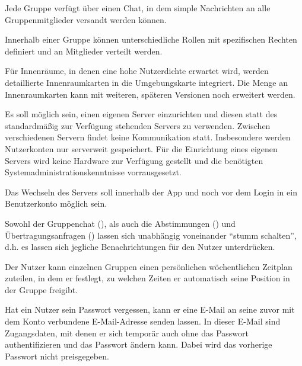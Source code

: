 \documentclass[parskip=full,11pt]{scrartcl}
\begin{document}
%
Jede Gruppe verfügt über einen Chat, in dem simple Nachrichten an alle
Gruppenmitglieder versandt werden können.

Innerhalb einer Gruppe können unterschiedliche Rollen
mit spezifischen Rechten definiert und an Mitglieder verteilt werden.

%
Für Innenräume, in denen eine hohe Nutzerdichte erwartet wird, werden
detaillierte Innenraumkarten in die Umgebungskarte integriert. Die Menge an
Innenraumkarten kann mit weiteren, späteren Versionen noch erweitert werden.

%
Es soll möglich sein, einen eigenen Server einzurichten und diesen statt des
standardmäßig zur Verfügung stehenden Servers zu verwenden.
Zwischen verschiedenen Servern findet keine Kommunikation statt.
Insbesondere werden Nutzerkonten nur serverweit gespeichert.
Für die Einrichtung eines eigenen Servers wird keine Hardware zur Verfügung
gestellt und die benötigten Systemadministrationskenntnisse vorrausgesetzt.

%
Das Wechseln des Servers soll innerhalb der App und noch vor dem Login in ein
Benutzerkonto möglich sein.

%
Sowohl der Gruppenchat (), als auch die
Abstimmungen () und Übertragungsanfragen
() lassen sich unabhängig voneinander
\enquote{stumm schalten}, d.h. es lassen sich jegliche Benachrichtungen für den
Nutzer unterdrücken.

%
Der Nutzer kann einzelnen Gruppen einen persönlichen wöchentlichen Zeitplan
zuteilen, in dem er festlegt, zu welchen Zeiten er automatisch seine Position
in der Gruppe freigibt.

%
Hat ein Nutzer sein Passwort vergessen, kann er eine E-Mail an seine zuvor
mit dem Konto verbundene E-Mail-Adresse senden lassen.
In dieser E-Mail sind Zugangsdaten, mit denen er sich temporär auch ohne das
Passwort authentifizieren und das Passwort ändern kann.
Dabei wird das vorherige Passwort nicht preisgegeben.
\end{document}
